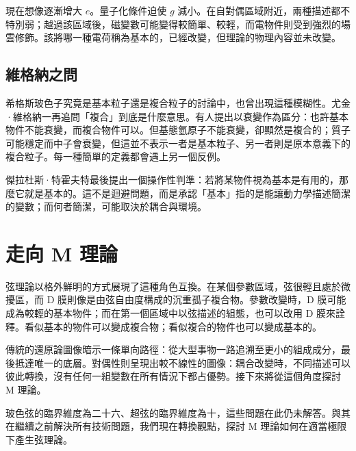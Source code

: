 現在想像逐漸增大 \(e\)。量子化條件迫使 \(g\) 減小。在自對偶區域附近，兩種描述都不特別弱；越過該區域後，磁變數可能變得較簡單、較輕，而電物件則受到強烈的場雲修飾。該將哪一種電荷稱為基本的，已經改變，但理論的物理內容並未改變。

\subsection{維格納之問}

希格斯玻色子究竟是基本粒子還是複合粒子的討論中，也曾出現這種模糊性。尤金·維格納一再追問「複合」到底是什麼意思。有人提出以衰變作為區分：也許基本物件不能衰變，而複合物件可以。但基態氫原子不能衰變，卻顯然是複合的；質子可能穩定而中子會衰變，但這並不表示一者是基本粒子、另一者則是原本意義下的複合粒子。每一種簡單的定義都會遇上另一個反例。

傑拉杜斯·特霍夫特最後提出一個操作性判準：若將某物件視為基本是有用的，那麼它就是基本的。這不是迴避問題，而是承認「基本」指的是能讓動力學描述簡潔的變數；而何者簡潔，可能取決於耦合與環境。

\section{走向 M 理論}

弦理論以格外鮮明的方式展現了這種角色互換。在某個參數區域，弦很輕且處於微擾區，而 D 膜則像是由弦自由度構成的沉重孤子複合物。參數改變時，D 膜可能成為較輕的基本物件；而在第一個區域中以弦描述的組態，也可以改用 D 膜來詮釋。看似基本的物件可以變成複合物；看似複合的物件也可以變成基本的。

傳統的還原論圖像暗示一條單向路徑：從大型事物一路追溯至更小的組成成分，最後抵達唯一的底層。對偶性則呈現出較不線性的圖像：耦合改變時，不同描述可以彼此轉換，沒有任何一組變數在所有情況下都占優勢。接下來將從這個角度探討 M 理論。

玻色弦的臨界維度為二十六、超弦的臨界維度為十，這些問題在此仍未解答。與其在繼續之前解決所有技術問題，我們現在轉換觀點，探討 M 理論如何在適當極限下產生弦理論。